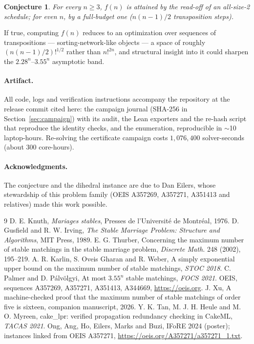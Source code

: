 \documentclass[11pt]{article}
\newtheorem{conjecture}{Conjecture}
\begin{document}
\begin{conjecture}\label{conj:size2}
For every $n\ge 3$, $f(n)$ is attained by the read-off of an all-size-2 schedule;
for even $n$, by a full-budget one ($n(n-1)/2$ transposition steps).
\end{conjecture}

If true, computing $f(n)$ reduces to an optimization over sequences of
transpositions --- sorting-network-like objects --- a space of roughly
$(n(n-1)/2)!^{1/2}$ rather than $n!^{2n}$, and structural insight into it could
sharpen the $2.28^n$--$3.55^n$ asymptotic band.

\paragraph{Artifact.} All code, logs and verification instructions accompany the repository at
the release commit cited here:
the campaign journal (SHA-256 in Section~\ref{sec:campaign}) with its audit, the Lean exporters and
the re-hash script that reproduce the identity checks, and the enumeration, reproducible in
$\sim$10 laptop-hours. Re-solving the certificate campaign costs $1{,}076{,}400$ solver-seconds
(about $300$ core-hours).

\paragraph{Acknowledgments.} The conjecture and the dihedral instance are due to Dan Eilers, whose
stewardship of this problem family (OEIS A357269, A357271, A351413 and relatives) made this work
possible.

\begin{thebibliography}{9}
 D. E. Knuth, \emph{Mariages stables}, Presses de l'Universit\'e de Montr\'eal, 1976.
 D. Gusfield and R. W. Irving, \emph{The Stable Marriage Problem: Structure and
Algorithms}, MIT Press, 1989.
 E. G. Thurber, Concerning the maximum number of stable matchings in the stable
marriage problem, \emph{Discrete Math.} 248 (2002), 195--219.
 A. R. Karlin, S. Oveis Gharan and R. Weber, A simply exponential upper bound on the
maximum number of stable matchings, \emph{STOC 2018}.
 C. Palmer and D. P\'alv\"olgyi, At most $3.55^n$ stable matchings, \emph{FOCS 2021}.
 OEIS, sequences A357269, A357271, A351413, A344669, \url{https://oeis.org}.
 J. Xu, A machine-checked proof that the maximum number of stable matchings of
order five is sixteen, companion manuscript, 2026.
 Y. K. Tan, M. J. H. Heule and M. O. Myreen, cake\_lpr: verified propagation
redundancy checking in CakeML, \emph{TACAS 2021}.
 Ong, Ang, Ho, Eilers, Marks and Buzi, IFoRE 2024 (poster); instances linked from
OEIS A357271, \url{https://oeis.org/A357271/a357271_1.txt}.
\end{thebibliography}
\end{document}
